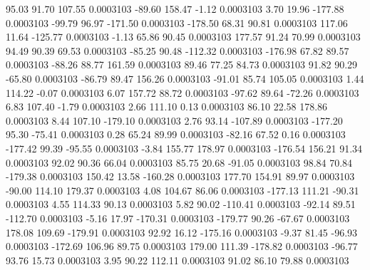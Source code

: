        95.03       91.70      107.55     0.0003103
      -89.60      158.47       -1.12     0.0003103
        3.70       19.96     -177.88     0.0003103
      -99.79       96.97     -171.50     0.0003103
     -178.50       68.31       90.81     0.0003103
      117.06       11.64     -125.77     0.0003103
       -1.13       65.86       90.45     0.0003103
      177.57       91.24       70.99     0.0003103
       94.49       90.39       69.53     0.0003103
      -85.25       90.48     -112.32     0.0003103
     -176.98       67.82       89.57     0.0003103
      -88.26       88.77      161.59     0.0003103
       89.46       77.25       84.73     0.0003103
       91.82       90.29      -65.80     0.0003103
      -86.79       89.47      156.26     0.0003103
      -91.01       85.74      105.05     0.0003103
        1.44      114.22       -0.07     0.0003103
        6.07      157.72       88.72     0.0003103
      -97.62       89.64      -72.26     0.0003103
        6.83      107.40       -1.79     0.0003103
        2.66      111.10        0.13     0.0003103
       86.10       22.58      178.86     0.0003103
        8.44      107.10     -179.10     0.0003103
        2.76       93.14     -107.89     0.0003103
     -177.20       95.30      -75.41     0.0003103
        0.28       65.24       89.99     0.0003103
      -82.16       67.52        0.16     0.0003103
     -177.42       99.39      -95.55     0.0003103
       -3.84      155.77      178.97     0.0003103
     -176.54      156.21       91.34     0.0003103
       92.02       90.36       66.04     0.0003103
       85.75       20.68      -91.05     0.0003103
       98.84       70.84     -179.38     0.0003103
      150.42       13.58     -160.28     0.0003103
      177.70      154.91       89.97     0.0003103
      -90.00      114.10      179.37     0.0003103
        4.08      104.67       86.06     0.0003103
     -177.13      111.21      -90.31     0.0003103
        4.55      114.33       90.13     0.0003103
        5.82       90.02     -110.41     0.0003103
      -92.14       89.51     -112.70     0.0003103
       -5.16       17.97     -170.31     0.0003103
     -179.77       90.26      -67.67     0.0003103
      178.08      109.69     -179.91     0.0003103
       92.92       16.12     -175.16     0.0003103
       -9.37       81.45      -96.93     0.0003103
     -172.69      106.96       89.75     0.0003103
      179.00      111.39     -178.82     0.0003103
      -96.77       93.76       15.73     0.0003103
        3.95       90.22      112.11     0.0003103
       91.02       86.10       79.88     0.0003103
